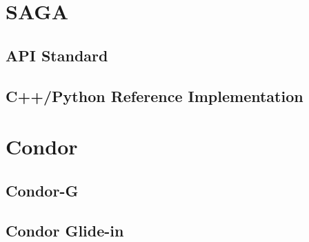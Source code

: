 	\section {SAGA}
	
	\subsection{API Standard}
	
	\subsection{C++/Python Reference Implementation}
	
	\section {Condor}
	
	\subsection{Condor-G}
	
	\subsection{Condor Glide-in}




